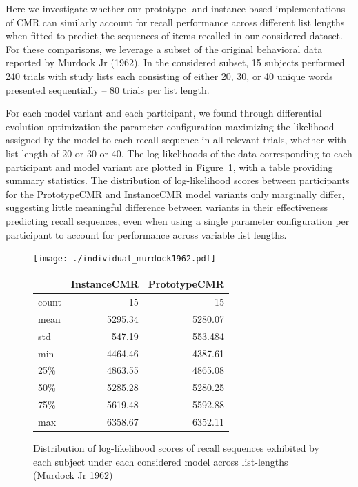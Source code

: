 \documentclass[
  letterpaper,
  DIV=11]{article}
\begin{document}
Here we investigate whether our prototype- and instance-based
implementations of CMR can similarly account for recall performance
across different list lengths when fitted to predict the sequences of
items recalled in our considered dataset. For these comparisons, we
leverage a subset of the original behavioral data reported by Murdock Jr
(1962). In the considered subset, 15 subjects performed 240 trials with
study lists each consisting of either 20, 30, or 40 unique words
presented sequentially -- 80 trials per list length.

For each model variant and each participant, we found through
differential evolution optimization the parameter configuration
maximizing the likelihood assigned by the model to each recall sequence
in all relevant trials, whether with list length of 20 or 30 or 40. The
log-likelihoods of the data corresponding to each participant and model
variant are plotted in Figure~\ref{fig-murd62fits}, with a table
providing summary statistics. The distribution of log-likelihood scores
between participants for the PrototypeCMR and InstanceCMR model variants
only marginally differ, suggesting little meaningful difference between
variants in their effectiveness predicting recall sequences, even when
using a single parameter configuration per participant to account for
performance across variable list lengths.

\begin{figure}

\begin{minipage}[c]{0.50\linewidth}

{\centering 

\texttt{[image: ./individual\_murdock1962.pdf]}

}

\end{minipage}%
%
\begin{minipage}[c]{0.50\linewidth}

{\centering 

\begin{longtable}[]{@{}lrr@{}}
\toprule
& InstanceCMR & PrototypeCMR \\
\midrule
\endhead
count & 15 & 15 \\
mean & 5295.34 & 5280.07 \\
std & 547.19 & 553.484 \\
min & 4464.46 & 4387.61 \\
25\% & 4863.55 & 4865.08 \\
50\% & 5285.28 & 5280.25 \\
75\% & 5619.48 & 5592.88 \\
max & 6358.67 & 6352.11 \\
\bottomrule
\end{longtable}

}

\end{minipage}%

\caption{\label{fig-murd62fits}Distribution of log-likelihood scores of
recall sequences exhibited by each subject under each considered model
across list-lengths (Murdock Jr 1962)}

\end{figure}
\end{document}
